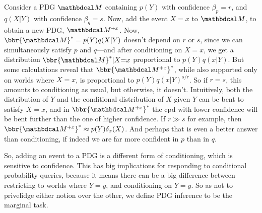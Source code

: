 \documentclass[twoside]{article}
\begin{document}
\begin{example}
	Consider a PDG $\dg M$ containing $p(Y)$ with confidence
    $\beta_p = r$, and $q(X|Y)$ with confidence $\beta_q = s$.
    Now, add the event $X{=}x$ to $\dg M$, to obtain
    a new PDG, $\dg M^{+x}$.
	Now, $\bbr{\dg M}^* = p(Y)q(X|Y)$ doesn't depend on $r$ or $s$, since we can simultaneously satisfy $p$ and $q$---and after conditioning on $X{=}x$, we get a distribution $\bbr{\dg M}^* | X{=}x$ proportional to $p(Y) q(x|Y)$.
	But some calculations reveal that $\bbr{\dg M^{+x}}^*$,
    while also supported only on worlds where $X{=}x$, is proportional to
	$p(Y) q(x|Y)^{s/r}$.
	So if $r = s$,
    this amounts to conditioning as usual, but otherwise,
    it doesn't.
    Intuitively, both the distribution of $Y$ and the conditional distribution of $X$ given $Y$ can be bent to satisfy $X{=}x$, and in $\bbr{\dg M^{+x}}^*$ the cpd with lower confidence will be bent further than the one of higher confidence.
    If $r \gg s$ for example,
    then $\bbr{\dg M^{+x}}^* \approx
    p(Y) \delta_x(X)$.
    And perhaps that is even a better answer than conditioning, if indeed we are far more confident in $p$ than in $q$.
\end{example}

So, adding an event to a PDG is a different form of conditioning,
which is sensitive to confidence.  This has big implications for responding to conditional probability queries, because it means there can be a big difference between restricting to worlds where $Y{=}y$, and conditioning on $Y{=}y$.
So as not to privelidge either notion over the other,
we define PDG inference to be the marginal task.
\end{document}
